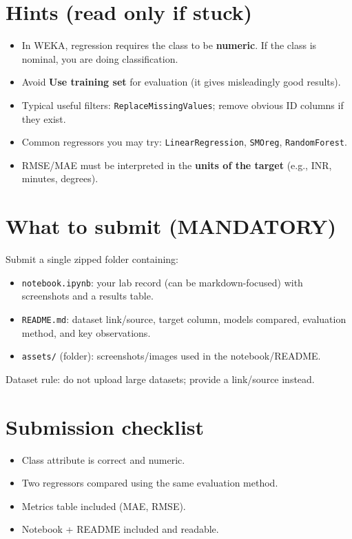 \documentclass[11pt]{article}
\begin{document}
\section{Hints (read only if stuck)}
\begin{itemize}[leftmargin=*]
  \item In WEKA, regression requires the class to be \textbf{numeric}. If the class is nominal, you are doing classification.
  \item Avoid \textbf{Use training set} for evaluation (it gives misleadingly good results).
  \item Typical useful filters: \texttt{ReplaceMissingValues}; remove obvious ID columns if they exist.
  \item Common regressors you may try: \texttt{LinearRegression}, \texttt{SMOreg}, \texttt{RandomForest}.
  \item RMSE/MAE must be interpreted in the \textbf{units of the target} (e.g., INR, minutes, degrees).
\end{itemize}

\section{What to submit (MANDATORY)}
Submit a single zipped folder containing:
\begin{itemize}[leftmargin=*]
  \item \texttt{notebook.ipynb}: your lab record (can be markdown-focused) with screenshots and a results table.
  \item \texttt{README.md}: dataset link/source, target column, models compared, evaluation method, and key observations.
  \item \texttt{assets/} (folder): screenshots/images used in the notebook/README.
\end{itemize}
Dataset rule: do not upload large datasets; provide a link/source instead.

\section{Submission checklist}
\begin{itemize}[leftmargin=*]
  \item Class attribute is correct and numeric.
  \item Two regressors compared using the same evaluation method.
  \item Metrics table included (MAE, RMSE).
  \item Notebook + README included and readable.
\end{itemize}
\end{document}

